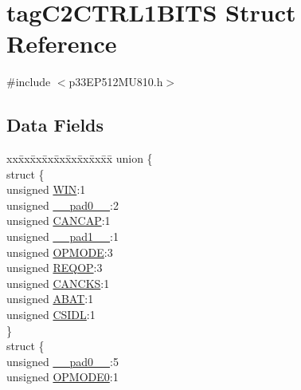 \hypertarget{structtag_c2_c_t_r_l1_b_i_t_s}{}\section{tag\+C2\+C\+T\+R\+L1\+B\+I\+TS Struct Reference}
\label{structtag_c2_c_t_r_l1_b_i_t_s}


{\ttfamily \#include $<$p33\+E\+P512\+M\+U810.\+h$>$}

\subsection*{Data Fields}
\begin{DoxyCompactItemize}
\item 
\begin{tabbing}
xx\=xx\=xx\=xx\=xx\=xx\=xx\=xx\=xx\=\kill
union \{\\
\>struct \{\\
\>\>unsigned \hyperlink{structtag_c2_c_t_r_l1_b_i_t_s_a90ca5ea17e8ea3beddc52942ba75c12d}{WIN}:1\\
\>\>unsigned \hyperlink{structtag_c2_c_t_r_l1_b_i_t_s_adf71f3d8410c1f1dbbc96680a92c49af}{\_\_pad0\_\_}:2\\
\>\>unsigned \hyperlink{structtag_c2_c_t_r_l1_b_i_t_s_a182da075d6e0a4ea562f849257f8c59e}{CANCAP}:1\\
\>\>unsigned \hyperlink{structtag_c2_c_t_r_l1_b_i_t_s_acaf2d0924a107ec6e8d2e31febaf66f9}{\_\_pad1\_\_}:1\\
\>\>unsigned \hyperlink{structtag_c2_c_t_r_l1_b_i_t_s_a01820f5081ba61cb9040ff44a67123cb}{OPMODE}:3\\
\>\>unsigned \hyperlink{structtag_c2_c_t_r_l1_b_i_t_s_a9908d34ca9c08b8946fd439ec9bd721a}{REQOP}:3\\
\>\>unsigned \hyperlink{structtag_c2_c_t_r_l1_b_i_t_s_a199db3a19f3c099225f38873670dd419}{CANCKS}:1\\
\>\>unsigned \hyperlink{structtag_c2_c_t_r_l1_b_i_t_s_af05a9e268e5f829b3159a367753d461b}{ABAT}:1\\
\>\>unsigned \hyperlink{structtag_c2_c_t_r_l1_b_i_t_s_a2180358be897944fe29e49fe5d608d70}{CSIDL}:1\\
\>\} \\
\>struct \{\\
\>\>unsigned \hyperlink{structtag_c2_c_t_r_l1_b_i_t_s_adf71f3d8410c1f1dbbc96680a92c49af}{\_\_pad0\_\_}:5\\
\>\>unsigned \hyperlink{structtag_c2_c_t_r_l1_b_i_t_s_a02b918d80a43676231c88e99e8a2ea26}{OPMODE0}:1\\

\end{tabbing}
\end{DoxyCompactItemize}
